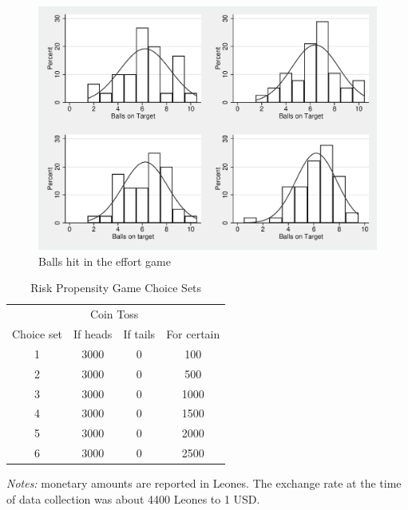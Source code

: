 \documentclass[10pt,a4paper]{scrartcl} %
\begin{document}
\begin{figure}
  \begin{centering}
    \includegraphics[width=0.6\linewidth]{"Outputs_anon/figures/f3_ballshit.eps"}
    \caption{Balls hit in the effort game}
    \label{fig:slf:ballshit}
  \end{centering}
\end{figure}

\begin{table}
  \centering
  \begin{threeparttable}
  \singlespacing
  \caption{Risk Propensity Game Choice Sets}
  \begin{tabular}{cccc}
    \toprule
          & \multicolumn{2}{c}{Coin Toss} &  \\
    Choice set & If heads & If tails & For certain \\
    \midrule
    1    & 3000  & 0     & 100 \\
    2    & 3000  & 0     & 500 \\
    3    & 3000  & 0     & 1000 \\
    4    & 3000  & 0     & 1500 \\
    5    & 3000  & 0     & 2000 \\
    6    & 3000  & 0     & 2500 \\
    \bottomrule
  \end{tabular}%
  \begin{tablenotes}
    \item \textit{Notes:} monetary amounts are reported in Leones. The exchange rate at the time of data collection was about 4400 Leones to 1 USD.
    \item
  \end{tablenotes}
  \label{tab:sl:riskchoice}%
  \end{threeparttable}%
\end{table}
\end{document}
